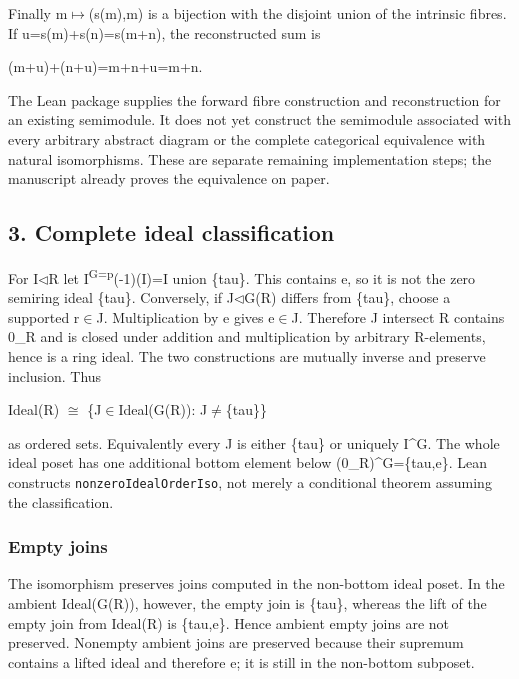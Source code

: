 Finally m\ensuremath{\mapsto}(s(m),m) is a bijection with the disjoint union of the
intrinsic fibres. If u=s(m)+s(n)=s(m+n), the reconstructed sum is

(m+u)+(n+u)=m+n+u=m+n.

The Lean package supplies the forward fibre construction and
reconstruction for an existing semimodule. It does not yet construct the
semimodule associated with every arbitrary abstract diagram or the
complete categorical equivalence with natural isomorphisms. These are
separate remaining implementation steps; the manuscript already proves
the equivalence on paper.

\subsection{3. Complete ideal
classification}\label{InheritedStructuralStage:complete-ideal-classification}

For I\ensuremath{\triangleleft}R let I\textsuperscript{G=p}(-1)(I)=I union \{tau\}. This contains
e, so it is not the zero semiring ideal \{tau\}. Conversely, if J\ensuremath{\triangleleft}G(R)
differs from \{tau\}, choose a supported r\ensuremath{\in}J. Multiplication by e gives
e\ensuremath{\in}J. Therefore J intersect R contains 0\_R and is closed under addition
and multiplication by arbitrary R-elements, hence is a ring ideal. The
two constructions are mutually inverse and preserve inclusion. Thus

Ideal(R) \ensuremath{\cong} \{J\ensuremath{\in}Ideal(G(R)): J\ensuremath{\ne}\{tau\}\}

as ordered sets. Equivalently every J is either \{tau\} or uniquely
I\^{}G. The whole ideal poset has one additional bottom element below
(0\_R)\^{}G=\{tau,e\}. Lean constructs \texttt{nonzeroIdealOrderIso},
not merely a conditional theorem assuming the classification.

\subsubsection{Empty joins}\label{InheritedStructuralStage:empty-joins}

The isomorphism preserves joins computed in the non-bottom ideal poset.
In the ambient Ideal(G(R)), however, the empty join is \{tau\}, whereas
the lift of the empty join from Ideal(R) is \{tau,e\}. Hence ambient
empty joins are not preserved. Nonempty ambient joins are preserved
because their supremum contains a lifted ideal and therefore e; it is
still in the non-bottom subposet.


